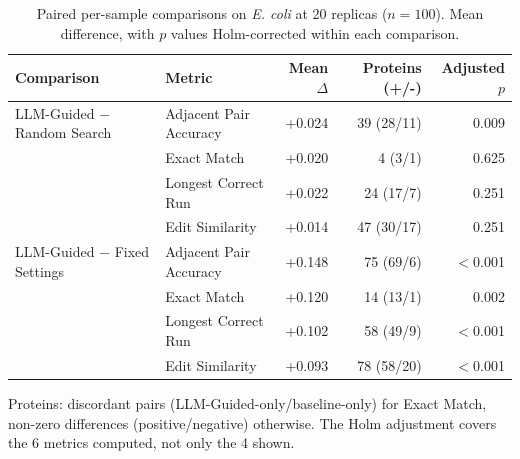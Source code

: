 \begin{table}[!tb]
  \centering
  \caption{Paired per-sample comparisons on \textnormal{\textnormal{\textit{E. coli}}} at 20 replicas ($n=100$). Mean difference, with $p$ values Holm-corrected within each comparison.}
  \label{tab:paired_tests_ecoli_r20}
  \begin{tabular}{llrrr}
    \toprule
    Comparison & Metric & Mean $\Delta$ & Proteins (+/-) & Adjusted $p$ \\
    \midrule
    LLM-Guided $-$ Random Search & Adjacent Pair Accuracy & +0.024 & 39 (28/11) & 0.009 \\
     & Exact Match & +0.020 & 4 (3/1) & 0.625 \\
     & Longest Correct Run & +0.022 & 24 (17/7) & 0.251 \\
     & Edit Similarity & +0.014 & 47 (30/17) & 0.251 \\
    \midrule
    LLM-Guided $-$ Fixed Settings & Adjacent Pair Accuracy & +0.148 & 75 (69/6) & $<$0.001 \\
     & Exact Match & +0.120 & 14 (13/1) & 0.002 \\
     & Longest Correct Run & +0.102 & 58 (49/9) & $<$0.001 \\
     & Edit Similarity & +0.093 & 78 (58/20) & $<$0.001 \\
    \bottomrule
  \end{tabular}
  \par\smallskip\footnotesize{Proteins: discordant pairs (LLM-Guided-only/baseline-only) for Exact Match, non-zero differences (positive/negative) otherwise. The Holm adjustment covers the 6 metrics computed, not only the 4 shown.}
\end{table}
